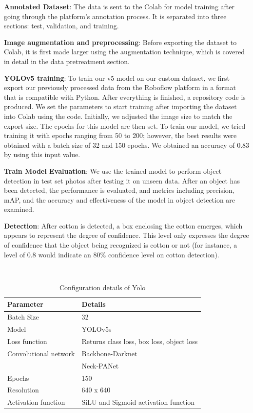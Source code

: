 \documentclass[12pt,a4paper]{report}
\begin{document}
\par {\bf{Annotated Dataset}}: The data is sent to the Colab for model training after going through the platform's annotation process. It is separated into three sections: test, validation, and training. 
\par {\bf{Image augmentation and preprocessing}}: Before exporting the dataset to Colab, it is first made larger using the augmentation technique, which is covered in detail in the data pretreatment section.
\par {\bf{YOLOv5 training}}: To train our v5 model on our custom dataset, we first export our previously processed data from the Roboflow platform in a format that is compatible with Python. After everything is finished, a repository code is produced. We set the parameters to start training after importing the dataset into Colab using the code. Initially, we adjusted the image size to match the export size. The epochs for this model are then set. To train our model, we tried training it with epochs ranging from 50 to 200; however, the best results were obtained with a batch size of 32 and 150 epochs. We obtained an accuracy of 0.83 by using this input value. 
\par {\bf{Train Model Evaluation}}: We use the trained model to perform object detection in test set photos after testing it on unseen data. After an object has been detected, the performance is evaluated, and metrics including precision, mAP, and the accuracy and effectiveness of the model in object detection are examined.  
\par {\bf{Detection}}: After cotton is detected, a box enclosing the cotton emerges, which appears to represent the degree of confidence. This level only expresses the degree of confidence that the object being recognized is cotton or not (for instance, a level of 0.8 would indicate an 80\% confidence level on cotton detection).

\begin{table}[H]
\begin{center}
\caption{Configuration details of Yolo}%
\hspace*{0.2in}
\\
\begin{tabular}{| p{5cm} | p{5cm} |}
\hline
{\bf{Parameter}}             &{\bf{Details}}          \\ \hline
Batch Size	& 32 \\ \hline
Model	& YOLOv5s\\ \hline
Loss function	& Returns class loss, box loss, object loss\\ \hline
Convolutional network& Backbone-Darknet \\ &Neck-PANet 
\\ \hline
Epochs &	150\\ \hline
Resolution &	640 x 640\\ \hline
Activation function &	SiLU and Sigmoid activation function\\ \hline
\end{tabular}
\end{center}
\end{table} 
\end{document}
